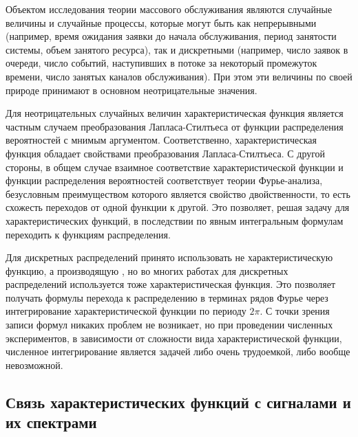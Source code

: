 Объектом исследования теории массового обслуживания являются случайные величины и случайные процессы, которые могут быть как непрерывными (например, время ожидания заявки до начала обслуживания, период занятости системы, объем занятого ресурса), так и дискретными (например, число заявок в очереди, число событий, наступивших в потоке за некоторый промежуток времени, число занятых каналов обслуживания). При этом эти величины по своей природе принимают в основном неотрицательные значения.

Для неотрицательных случайных величин характеристическая функция является частным случаем преобразования Лапласа-Стилтьеса от функции распределения вероятностей с мнимым аргументом. Соответственно, характеристическая функция обладает свойствами преобразования Лапласа-Стилтьеса. С другой стороны, в общем случае взаимное соответствие характеристической функции и функции распределения вероятностей соответствует теории Фурье-анализа, безусловным преимуществом которого является свойство двойственности, то есть схожесть переходов от одной функции к другой. Это позволяет, решая задачу для характеристических функций, в последствии по явным интегральным формулам переходить к функциям распределения.

Для дискретных распределений принято использовать не характеристическую функцию, а производящую \cite{kalinina2016}, но во многих работах для дискретных распределений используется тоже характеристическая функция. Это позволяет получать формулы перехода к распределению в терминах рядов Фурье через интегрирование характеристической функции по периоду $2\pi$. С точки зрения записи формул никаких проблем не возникает, но при проведении численных экспериментов, в зависимости от сложности вида характеристической функции, численное интегрирование является задачей либо очень трудоемкой, либо вообще невозможной.
\subsection{Связь характеристических функций с сигналами и их спектрами}

